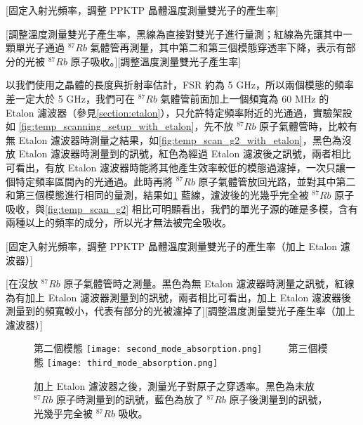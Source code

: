 \documentclass[class=NCU_thesis, crop=false]{standalone}
\begin{document}
[固定入射光頻率，調整 PPKTP 晶體溫度測量雙光子的產生率]

[調整溫度測量雙光子產生率，黑線為直接對雙光子進行量測；紅線為先讓其中一顆單光子通過 $^{87}Rb$ 氣體管再測量，其中第二和第三個模態穿透率下降，表示有部分的光被 $^{87}Rb$ 原子吸收。][調整溫度測量雙光子產生率]

以我們使用之晶體的長度與折射率估計，FSR 約為 5 GHz，所以兩個模態的頻率差一定大於 5 GHz，我們可在 $^{87}Rb$ 氣體管前面加上一個頻寬為 60 MHz 的 Etalon 濾波器（參見\cref{section:etalon}），只允許特定頻率附近的光通過，實驗架設如 \cref{fig:temp_scanning_setup_with_etalon}，先不放 $^{87}Rb$ 原子氣體管時，比較有無 Etalon 濾波器時測量之結果，如\cref{fig:temp_scan_g2_with_etalon}，黑色為沒放 Etalon 濾波器時測量到的訊號，紅色為經過 Etalon 濾波後之訊號，兩者相比可看出，有放 Etalon 濾波器時能將其他產生效率較低的模態過濾掉，一次只讓一個特定頻率區間內的光通過。此時再將 $^{87}Rb$ 原子氣體管放回光路，並對其中第二和第三個模態進行相同的量測，結果如\cref{fig:absorption_etalon_temp_scanning} 藍線，濾波後的光幾乎完全被 $^{87}Rb$ 原子吸收，與\cref{fig:temp_scan_g2} 相比可明顯看出，我們的單光子源的確是多模，含有兩種以上的頻率的成分，所以光才無法被完全吸收。

[固定入射光頻率，調整 PPKTP 晶體溫度測量雙光子的產生率（加上 Etalon 濾波器）]

[在沒放 $^{87}Rb$ 原子氣體管時之測量。黑色為無 Etalon 濾波器時測量之訊號，紅線為有加上 Etalon 濾波器測量到的訊號，兩者相比可看出，加上 Etalon 濾波器後測量到的頻寬較小，代表有部分的光被濾掉了][調整溫度測量雙光子產生率（加上濾波器）]
\begin{figure}[!hbt]
    \centering
    \subcaptionbox
        {第二個模態
        \label{fig:subfig_fig1}}
        {\texttt{[image: second\_mode\_absorption.png]}}
    ~~~~
    \subcaptionbox
        {第三個模態
        \label{fig:subfig_fig2}}
        {\texttt{[image: third\_mode\_absorption.png]}}
    \caption[加上 Etalon 濾波器之後，光就能完全被原子吸收]{加上 Etalon 濾波器之後，測量光子對原子之穿透率。黑色為未放 $^{87}Rb$ 原子時測量到的訊號，藍色為放了 $^{87}Rb$ 原子後測量到的訊號，光幾乎完全被  $^{87}Rb$ 吸收。}
    \label{fig:absorption_etalon_temp_scanning}
\end{figure}
\end{document}
